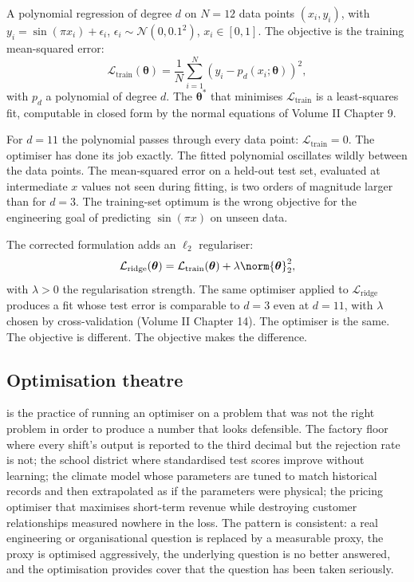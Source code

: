 A polynomial regression of degree $d$ on $N = 12$ data points
$(x_{i}, y_{i})$, with $y_{i} = \sin(\pi x_{i}) + \epsilon_{i}$,
$\epsilon_{i} \sim \mathcal{N}(0, 0.1^{2})$, $x_{i} \in [0, 1]$.
The objective is the training mean-squared error:
\[
\mathcal{L}_{\text{train}}(\boldsymbol{\theta}) = \frac{1}{N}
\sum_{i=1}^{N} (y_{i} - p_{d}(x_{i}; \boldsymbol{\theta}))^{2},
\]
with $p_{d}$ a polynomial of degree $d$. The
$\boldsymbol{\theta}^{*}$ that minimises $\mathcal{L}_{\text{train}}$
is a least-squares fit, computable in closed form by the normal
equations of Volume II Chapter 9.

For $d = 11$ the polynomial passes through every data point:
$\mathcal{L}_{\text{train}} = 0$. The optimiser has done its job
exactly. The fitted polynomial oscillates wildly between the
data points. The mean-squared error on a held-out test set,
evaluated at intermediate $x$ values not seen during fitting, is
two orders of magnitude larger than for $d = 3$. The training-set
optimum is the wrong objective for the engineering goal of
predicting $\sin(\pi x)$ on unseen data.

The corrected formulation adds an $\ell_{2}$ regulariser:
\[
\mathcal{L}_{\text{ridge}}(\boldsymbol{\theta}) =
\mathcal{L}_{\text{train}}(\boldsymbol{\theta}) + \lambda
\norm{\boldsymbol{\theta}}_{2}^{2},
\]
with $\lambda > 0$ the regularisation strength. The same
optimiser applied to $\mathcal{L}_{\text{ridge}}$ produces a fit
whose test error is comparable to $d = 3$ even at $d = 11$, with
$\lambda$ chosen by cross-validation (Volume II Chapter 14). The
optimiser is the same. The objective is different. The objective
makes the difference.

\subsection{Optimisation theatre}

 is the practice of running an
optimiser on a problem that was not the right problem in order
to produce a number that looks defensible. The factory floor
where every shift's output is reported to the third decimal but
the rejection rate is not; the school district where standardised
test scores improve without learning; the climate model whose
parameters are tuned to match historical records and then
extrapolated as if the parameters were physical; the pricing
optimiser that maximises short-term revenue while destroying
customer relationships measured nowhere in the loss. The pattern
is consistent: a real engineering or organisational question is
replaced by a measurable proxy, the proxy is optimised
aggressively, the underlying question is no better answered, and
the optimisation provides cover that the question has been taken
seriously.

